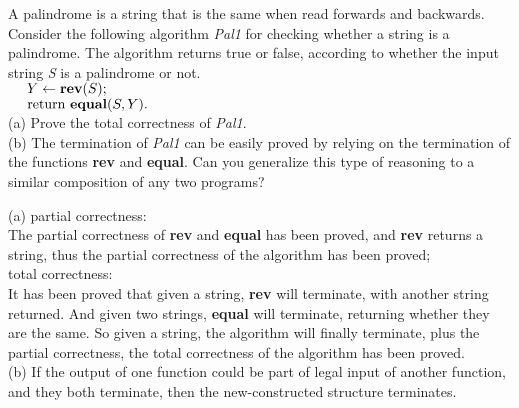\documentclass[11pt, a4paper, UTF8]{ctexart}
\begin{document}
\begin{problem}[DH: 5.10]
  A palindrome is a string that is the same when read forwards and backwards. 
  Consider the following algorithm \textsl{Pal1} for checking whether a string 
  is a palindrome. The algorithm returns true or false, according to whether 
  the input string \textsl{S} is a palindrome or not.\\
  $~~~~Y \gets \text{\textbf{rev}($S$);}$\\
  $~~~~\text{return \textbf{equal}($S, Y$).}$\\
  (a) Prove the total correctness of \textsl{Pal1}.\\
  (b) The termination of \textsl{Pal1} can be easily proved by relying on the 
  termination of the functions \textbf{rev} and \textbf{equal}. Can you generalize 
  this type of reasoning to a similar composition of any two programs?
\end{problem}


\begin{solution}
  (a) partial correctness: \\
  The partial correctness of \textbf{rev} and \textbf{equal} has been proved, 
  and \textbf{rev} returns a string, thus the partial correctness of the 
  algorithm has been proved;\\
  total correctness:\\
  It has been proved that given a string, \textbf{rev} will terminate, with 
  another string returned. And given two strings, \textbf{equal} will terminate, 
  returning whether they are the same. So given a string, the algorithm will 
  finally terminate, plus the partial correctness, the total correctness of 
  the algorithm has been proved.\\
  (b) If the output of one function could be part of legal input of another 
  function, and they both terminate, then the new-constructed structure terminates.  
\end{solution}
\end{document}
